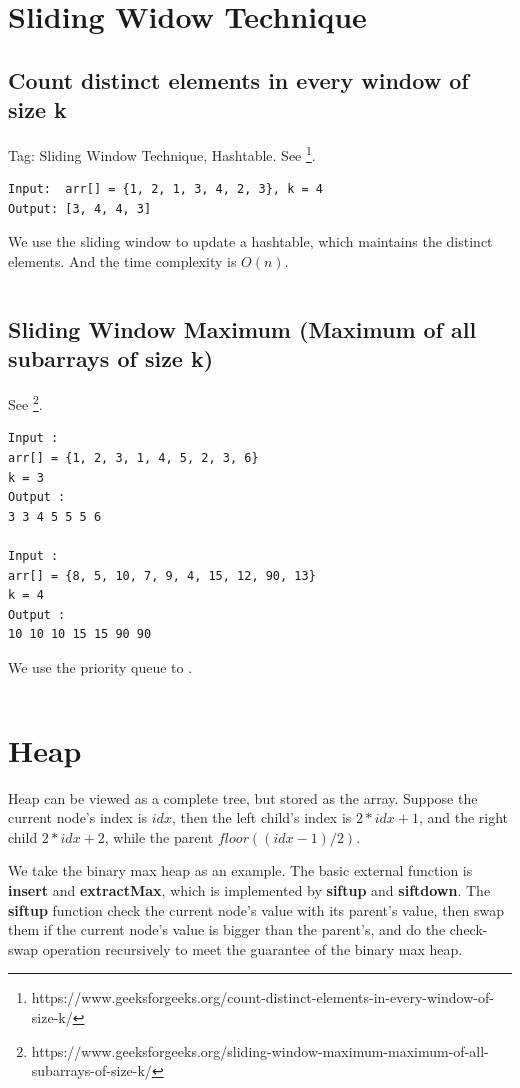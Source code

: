 \documentclass[11pt]{article}
\begin{document}
\section{Sliding Widow Technique}
\subsection{Count distinct elements in every window of size k}
Tag: Sliding Window Technique, Hashtable. 
See \footnote{https://www.geeksforgeeks.org/count-distinct-elements-in-every-window-of-size-k/}.

\begin{verbatim}
Input:  arr[] = {1, 2, 1, 3, 4, 2, 3}, k = 4
Output: [3, 4, 4, 3]
\end{verbatim}

We use the sliding window to update a hashtable, which maintains the distinct elements. And the time complexity is $O(n)$.

\inputminted{python}{src/distinct.py}

\subsection{Sliding Window Maximum (Maximum of all subarrays of size k)}

See \footnote{https://www.geeksforgeeks.org/sliding-window-maximum-maximum-of-all-subarrays-of-size-k/}.
\begin{verbatim}
Input :
arr[] = {1, 2, 3, 1, 4, 5, 2, 3, 6}
k = 3
Output :
3 3 4 5 5 5 6

Input :
arr[] = {8, 5, 10, 7, 9, 4, 15, 12, 90, 13}
k = 4
Output :
10 10 10 15 15 90 90
\end{verbatim}

We use the priority queue to .

\inputminted{python}{src/maxSlidingWindow.py}

\section{Heap}
Heap can be viewed as a complete tree, but stored as the array. 
Suppose the current node's index is $idx$, then the left child's index is $2*idx+1$, and the right child $2*idx+2$, while the parent $floor((idx-1)/2)$.

We take the binary max heap as an example. 
The basic external function is \textbf{insert} and \textbf{extractMax}, which is implemented by \textbf{siftup} and \textbf{siftdown}. 
The \textbf{siftup} function check the current node's value with its parent's value, then swap them if the current node's value is bigger than the parent's, and do the check-swap operation recursively to meet the guarantee 
	of the binary max heap.
	
\end{document}
